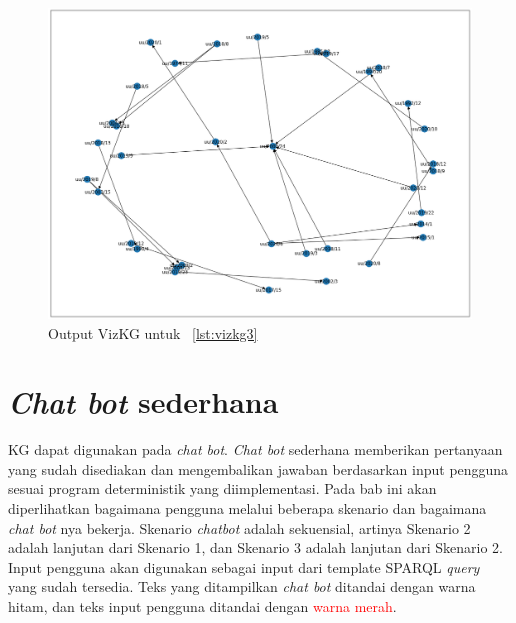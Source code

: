 \begin{figure}[H]
  \centering
  \includegraphics[width=\textwidth]{pictures/vizkg3.png}
  \caption{Output VizKG untuk \lst~\ref{lst:vizkg3}}
  \label{fig:vizkg3}
\end{figure}


\section{\textit{Chat bot} sederhana}
\label{sec:chatbot-sederhana}


KG \legal dapat digunakan pada \textit{chat bot}. \textit{Chat bot} sederhana memberikan pertanyaan
yang sudah disediakan dan mengembalikan jawaban berdasarkan input pengguna sesuai program
deterministik yang diimplementasi. Pada bab ini akan diperlihatkan bagaimana pengguna melalui
beberapa skenario dan bagaimana \textit{chat bot} nya bekerja. Skenario \textit{chatbot} adalah
sekuensial, artinya Skenario 2 adalah lanjutan dari Skenario 1, dan Skenario 3 adalah lanjutan dari
Skenario 2. Input pengguna akan digunakan sebagai input dari template SPARQL \textit{query} yang
sudah tersedia. Teks yang ditampilkan \textit{chat bot} ditandai dengan warna hitam, dan teks input
pengguna ditandai dengan \textcolor{red}{warna merah}.

